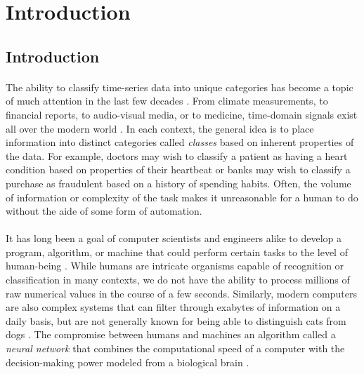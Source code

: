 \documentclass[12pt,letterpaper]{article}
\begin{document}
\newpage
\section{Introduction}
\label{sec-Introduction}


\subsection{Introduction}

\paragraph*{}The ability to classify time-series data into unique categories has become a topic of much attention in the last few decades \cite{Khan,Mierswa}. From climate measurements, to financial reports, to audio-visual media, or to medicine, time-domain signals exist all over the modern world \cite{Virtanen}. In each context, the general idea is to place information into distinct categories called \textit{classes} based on inherent properties of the data. For example, doctors may wish to classify a patient as having a heart condition based on properties of their heartbeat or banks may wish to classify a purchase as fraudulent based on a history of spending habits. Often, the volume  of information or complexity of the task makes it unreasonable for a human to do without the aide of some form of automation.

\paragraph*{}It has long been a goal of computer scientists and engineers alike to develop a program, algorithm, or machine that could perform certain tasks to the level of human-being \cite{Bishop,Geron,Loy}. While humans are intricate organisms capable of recognition or classification in many contexts, we do not have the ability to process millions of raw numerical values in the course of a few seconds. Similarly, modern computers are also complex systems that can filter through exabytes of information on a daily basis, but are not generally known for being able to distinguish cats from dogs \cite{Geron}. The compromise between humans and machines an algorithm called a \textit{neural network} that combines the computational speed of a computer with the decision-making power modeled from a biological brain \cite{Goodfellow,Levine,Loy}.
\end{document}
